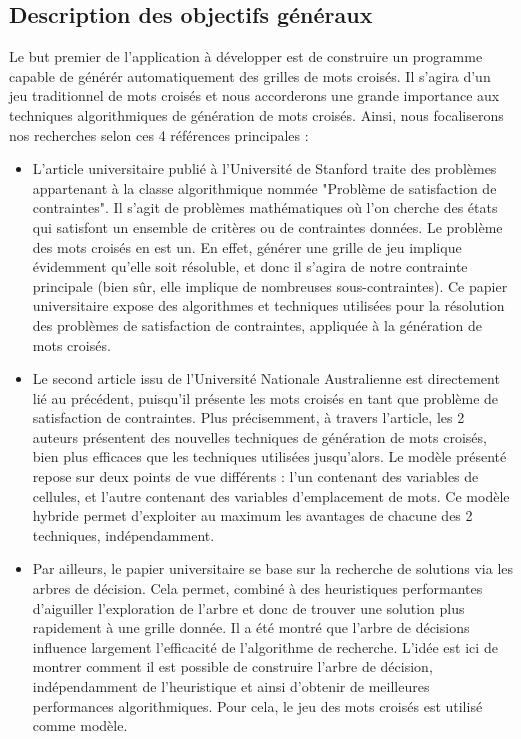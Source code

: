 \documentclass [ 11 pt ] {article}
\begin{document}
    \subsection{Description des objectifs généraux}
    
    \hspace{1cm} Le but premier de l'application à développer est de construire un programme capable de générér automatiquement des grilles de mots croisés. Il s'agira d'un jeu traditionnel de mots croisés et nous accorderons une grande importance aux techniques algorithmiques de génération de mots croisés. Ainsi, nous focaliserons nos recherches selon ces 4 références principales : \newline
    
        \begin{itemize}
            \item L'article universitaire \cite{CpC} publié à l'Université de Stanford traite des problèmes appartenant à la classe algorithmique nommée "Problème de satisfaction de contraintes". Il s'agit de problèmes mathématiques où l'on cherche des états qui satisfont un ensemble de critères ou de contraintes données. Le problème des mots croisés en est un. En effet, générer une grille de jeu implique évidemment qu'elle soit résoluble, et donc il s'agira de notre contrainte principale (bien sûr, elle implique de nombreuses sous-contraintes). Ce papier universitaire expose des algorithmes et techniques utilisées pour la résolution des problèmes de satisfaction de contraintes, appliquée à la génération de mots croisés. \\
            
            \item Le second article \cite{CpP} issu de l'Université Nationale Australienne est directement lié au précédent, puisqu'il présente les mots croisés en tant que problème de satisfaction de contraintes. Plus précisemment, à travers l'article, les 2 auteurs présentent des nouvelles techniques de génération de mots croisés, bien plus efficaces que les techniques utilisées jusqu'alors. Le modèle présenté repose sur deux points de vue différents : l'un contenant des variables de cellules, et l'autre contenant des variables d'emplacement de mots. Ce modèle hybride permet d'exploiter au maximum les avantages de chacune des 2 techniques, indépendamment. \\
            
            \item Par ailleurs, le papier universitaire \cite{CpL} se base sur la recherche de solutions via les arbres de décision. Cela permet, combiné à des heuristiques performantes d'aiguiller l'exploration de l'arbre et donc de trouver une solution plus rapidement à une grille donnée. Il a été montré que l'arbre de décisions influence largement l'efficacité de l'algorithme de recherche. L'idée est ici de montrer comment il est possible de construire l'arbre de décision, indépendamment de l'heuristique et ainsi d'obtenir de meilleures performances algorithmiques. Pour cela, le jeu des mots croisés est utilisé comme modèle. \\
            

\end{itemize}
\end{document}
